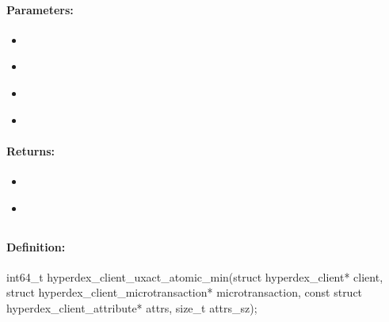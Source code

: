 \paragraph{Parameters:}
\begin{itemize}[noitemsep]
\item {}\\

\item {}\\

\item {}\\

\item {}\\

\end{itemize}

\paragraph{Returns:}
\begin{itemize}[noitemsep]
\item {}\\

\item {}\\

\end{itemize}

\pagebreak
\subsection{}
\label{api:c:uxact_atomic_min}


\paragraph{Definition:}
\begin{ccode}
int64_t hyperdex_client_uxact_atomic_min(struct hyperdex_client* client,
        struct hyperdex_client_microtransaction* microtransaction,
        const struct hyperdex_client_attribute* attrs, size_t attrs_sz);
\end{ccode}


